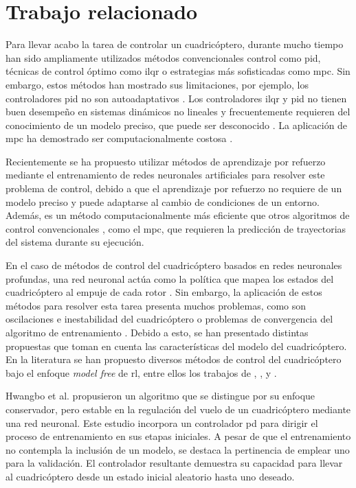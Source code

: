 \section{Trabajo relacionado}

Para llevar acabo la tarea de controlar un cuadricóptero, durante mucho tiempo han sido ampliamente utilizados métodos convencionales control como \acrfull{pid}\cite{astrom2008feedback}, técnicas de control óptimo como \acrfull{ilqr} \cite{Tassa2012} o estrategias más sofisticadas como \acrfull{mpc}\cite{rawlings2017mpc}. Sin embargo, estos métodos han mostrado sus limitaciones, por ejemplo, los controladores \acrshort{pid} no son autoadaptativos \cite{pang2021}. Los controladores \acrshort{ilqr} y \acrshort{pid} no tienen buen desempeño en sistemas dinámicos no lineales y frecuentemente requieren del conocimiento de un modelo preciso, que puede ser desconocido \cite{pang2021}. La aplicación de \acrshort{mpc} ha demostrado ser computacionalmente costosa \cite{zhang2016}.

Recientemente se ha propuesto utilizar métodos de aprendizaje por refuerzo mediante el entrenamiento de redes neuronales artificiales para resolver este problema de control, debido a que el aprendizaje por refuerzo no requiere de un modelo preciso y puede adaptarse al cambio de condiciones de un entorno. Además, es un método computacionalmente más eficiente que otros algoritmos de control convencionales \cite{zhang2016}, como el \acrshort{mpc}, que requieren la predicción de trayectorias del sistema durante su ejecución.  

En el caso de métodos de control del cuadricóptero basados en redes neuronales profundas, una red neuronal actúa como la política que mapea los estados del cuadricóptero al empuje de cada rotor \cite{hwangbo2017control}. Sin embargo, la aplicación de estos métodos para resolver esta tarea presenta muchos problemas, como son oscilaciones e inestabilidad del cuadricóptero o problemas de convergencia del algoritmo de entrenamiento \cite{liu2022robust}. Debido a esto, se han presentado distintas propuestas que toman en cuenta las características del modelo del cuadricóptero. En la literatura se han propuesto diversos métodos de control del cuadricóptero bajo el enfoque \textit{model free} de \acrshort{rl}, entre ellos los trabajos de \cite{liu2022robust}, \cite{Rub2020DeepRL}, \cite{fang-i2019} y \cite{lopes2018intelligent}.

Hwangbo et al. \cite{hwangbo2017control} propusieron un algoritmo que se distingue por su enfoque conservador, pero estable en la regulación del vuelo de un cuadricóptero mediante una red neuronal. Este estudio incorpora un controlador \acrfull{pd} para dirigir el proceso de entrenamiento en sus etapas iniciales. A pesar de que el entrenamiento no contempla la inclusión de un modelo, se destaca la pertinencia de emplear uno para la validación. El controlador resultante demuestra su capacidad para llevar al cuadricóptero desde un estado inicial aleatorio hasta uno deseado.

